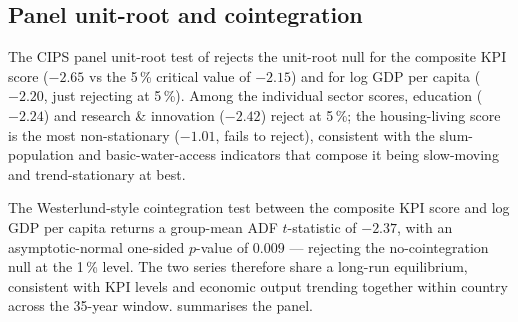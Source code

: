 \subsection{Panel unit-root and cointegration}\label{sec:robust_coint}

The CIPS panel unit-root test of \textcite{pesaran2007} rejects the unit-root null for the composite KPI score ($-2.65$ vs the 5\,\% critical value of $-2.15$) and for log GDP per capita ($-2.20$, just rejecting at 5\,\%). Among the individual sector scores, education ($-2.24$) and research \& innovation ($-2.42$) reject at 5\,\%; the housing-living score is the most non-stationary ($-1.01$, fails to reject), consistent with the slum-population and basic-water-access indicators that compose it being slow-moving and trend-stationary at best.

The Westerlund-style cointegration test between the composite KPI score and log GDP per capita returns a group-mean ADF $t$-statistic of $-2.37$, with an asymptotic-normal one-sided $p$-value of $0.009$ --- rejecting the no-cointegration null at the 1\,\% level. The two series therefore share a long-run equilibrium, consistent with KPI levels and economic output trending together within country across the 35-year window.  summarises the panel.

